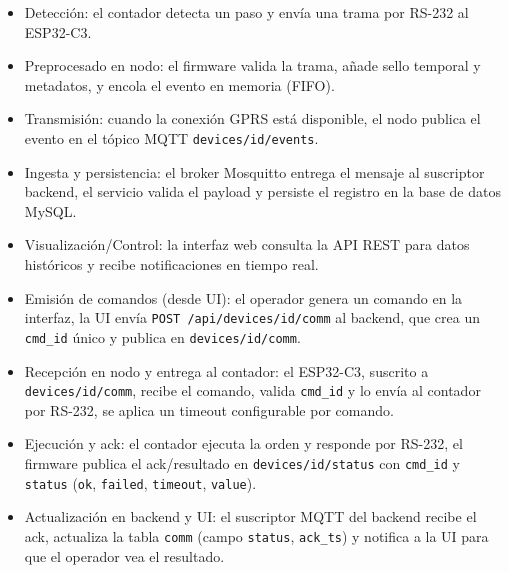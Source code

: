 \begin{itemize}

  \item Detección: el contador detecta un paso y envía una trama por RS-232 al ESP32-C3.

  \item Preprocesado en nodo: el firmware valida la trama, añade sello temporal y metadatos, y encola el evento en memoria (FIFO).

  \item Transmisión: cuando la conexión GPRS está disponible, el nodo publica el evento en el tópico MQTT \texttt{devices/{id}/events}.
  
  \item Ingesta y persistencia: el broker Mosquitto entrega el mensaje al suscriptor backend, el servicio valida el payload y persiste el registro en la base de datos MySQL.
  
  \item Visualización/Control: la interfaz web consulta la API REST para datos históricos y recibe notificaciones en tiempo real.
  
  \item Emisión de comandos (desde UI): el operador genera un comando en la interfaz, la UI envía
  \texttt{POST /api/devices/{id}/comm} al backend, que crea un \texttt{cmd\_id} único y publica en \texttt{devices/{id}/comm}.
  
  \item Recepción en nodo y entrega al contador: el ESP32-C3, suscrito a \texttt{devices/{id}/comm}, recibe el comando, valida \texttt{cmd\_id} y lo envía al contador por RS-232, se aplica un timeout configurable por comando.
  
  \item Ejecución y ack: el contador ejecuta la orden y responde por RS-232, el firmware publica el ack/resultado en \texttt{devices/{id}/status} con \texttt{cmd\_id} y \texttt{status} (\texttt{ok}, \texttt{failed}, \texttt{timeout}, \texttt{value}).

  \item Actualización en backend y UI: el suscriptor MQTT del backend recibe el ack, actualiza la tabla \texttt{comm} (campo \texttt{status}, \texttt{ack\_ts}) y notifica a la UI para que el operador vea el resultado.
\end{itemize}


